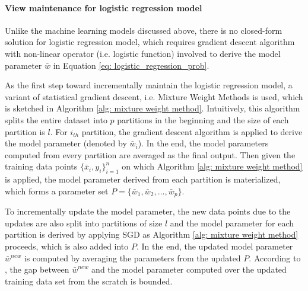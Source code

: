 \paragraph{View maintenance for logistic regression model}
Unlike the machine learning models discussed above, there is no closed-form solution for logistic regression model, which requires gradient descent algorithm with non-linear operator (i.e. logistic function) involved to derive the model parameter $\bar{w}$ in Equation \ref{eq: logistic_regression_prob}. 

As the first step toward incrementally maintain the logistic regression model, a variant of statistical gradient descent, i.e. Mixture Weight Methods \cite{mcdonald2009efficient} is used, which is sketched in Algorithm \ref{alg: mixture weight method}. Intuitively, this algorithm splits the entire dataset into $p$ partitions in the beginning and the size of each partition is $l$. For $i_{th}$ partition, the gradient descent algorithm is applied to derive the model parameter (denoted by $\bar{w}_i$). In the end, the model parameters computed from every partition are averaged as the final output. Then given the training data points $\{\bar{x}_i, y_i\}_{i=1}^n$ on which Algorithm \ref{alg: mixture weight method} is applied, the model parameter derived from each partition is materialized, which forms a parameter set $P = \{\bar{w}_1, \bar{w}_2, \dots, \bar{w}_p\}$. 

To incrementally update the model parameter, the new data points due to the updates are also split into partitions of size $l$ and the model parameter for each partition is derived by applying SGD as Algorithm \ref{alg: mixture weight method} proceeds, which is also added into $P$. In the end, the updated model parameter $\bar{w}^{new}$ is computed by averaging the parameters from the updated $P$. According to \cite{mcdonald2009efficient}, the gap between $\bar{w}^{new}$ and the model parameter computed over the updated training data set from the scratch is bounded.


